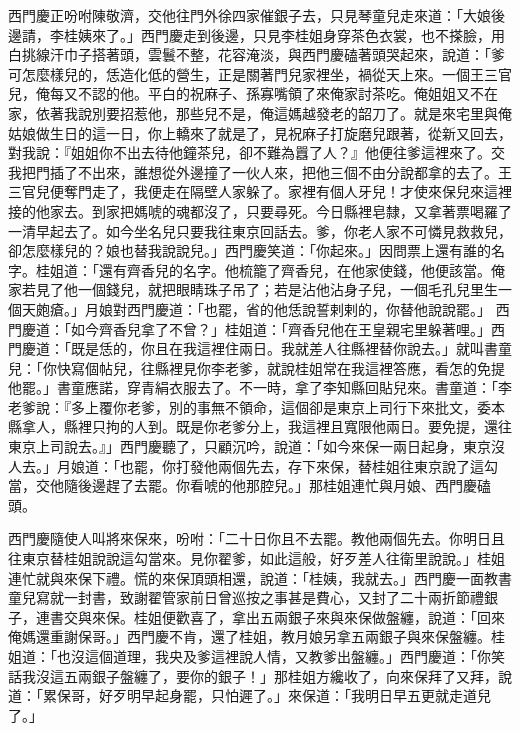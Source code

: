 西門慶正吩咐陳敬濟，交他往門外徐四家催銀子去，只見琴童兒走來道：「大娘後邊請，李桂姨來了。」西門慶走到後邊，只見李桂姐身穿茶色衣裳，也不搽臉，用白挑線汗巾子搭著頭，雲鬟不整，花容淹淡，與西門慶磕著頭哭起來，說道：「爹可怎麼樣兒的，恁造化低的營生，正是關著門兒家裡坐，禍從天上來。一個王三官兒，俺每又不認的他。平白的祝麻子、孫寡嘴領了來俺家討茶吃。俺姐姐又不在家，依著我說別要招惹他，那些兒不是，俺這媽越發老的韶刀了。就是來宅里與俺姑娘做生日的這一日，你上轎來了就是了，見祝麻子打旋磨兒跟著，從新又回去，對我說：『姐姐你不出去待他鐘茶兒，卻不難為囂了人？』他便往爹這裡來了。交我把門插了不出來，誰想從外邊撞了一伙人來，把他三個不由分說都拿的去了。王三官兒便奪門走了，我便走在隔壁人家躲了。家裡有個人牙兒！才使來保兒來這裡接的他家去。到家把媽唬的魂都沒了，只要尋死。今日縣裡皂隸，又拿著票喝羅了一清早起去了。如今坐名兒只要我往東京回話去。爹，你老人家不可憐見救救兒，卻怎麼樣兒的？娘也替我說說兒。」西門慶笑道：「你起來。」因問票上還有誰的名字。桂姐道：「還有齊香兒的名字。他梳籠了齊香兒，在他家使錢，他便該當。俺家若見了他一個錢兒，就把眼睛珠子吊了；若是沾他沾身子兒，一個毛孔兒里生一個天皰瘡。」月娘對西門慶道：「也罷，省的他恁說誓剌剌的，你替他說說罷。」 西門慶道：「如今齊香兒拿了不曾？」桂姐道：「齊香兒他在王皇親宅里躲著哩。」西門慶道：「既是恁的，你且在我這裡住兩日。我就差人往縣裡替你說去。」就叫書童兒：「你快寫個帖兒，往縣裡見你李老爹，就說桂姐常在我這裡答應，看怎的免提他罷。」書童應諾，穿青絹衣服去了。不一時，拿了李知縣回貼兒來。書童道：「李老爹說：『多上覆你老爹，別的事無不領命，這個卻是東京上司行下來批文，委本縣拿人，縣裡只拘的人到。既是你老爹分上，我這裡且寬限他兩日。要免提，還往東京上司說去。』」西門慶聽了，只顧沉吟，說道：「如今來保一兩日起身，東京沒人去。」月娘道：「也罷，你打發他兩個先去，存下來保，替桂姐往東京說了這勾當，交他隨後邊趕了去罷。你看唬的他那腔兒。」那桂姐連忙與月娘、西門慶磕頭。

西門慶隨使人叫將來保來，吩咐：「二十日你且不去罷。教他兩個先去。你明日且往東京替桂姐說說這勾當來。見你翟爹，如此這般，好歹差人往衛里說說。」桂姐連忙就與來保下禮。慌的來保頂頭相還，說道：「桂姨，我就去。」西門慶一面教書童兒寫就一封書，致謝翟管家前日曾巡按之事甚是費心，又封了二十兩折節禮銀子，連書交與來保。桂姐便歡喜了，拿出五兩銀子來與來保做盤纏，說道：「回來俺媽還重謝保哥。」西門慶不肯，還了桂姐，教月娘另拿五兩銀子與來保盤纏。桂姐道：「也沒這個道理，我央及爹這裡說人情，又教爹出盤纏。」西門慶道：「你笑話我沒這五兩銀子盤纏了，要你的銀子！」那桂姐方纔收了，向來保拜了又拜，說道：「累保哥，好歹明早起身罷，只怕遲了。」來保道：「我明日早五更就走道兒了。」

